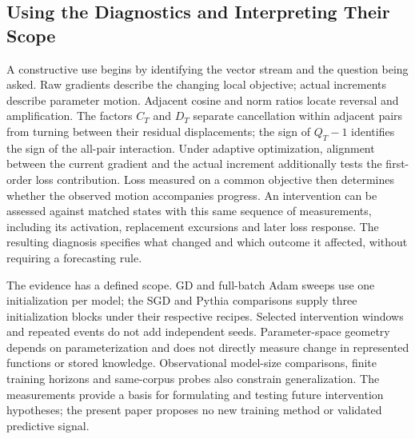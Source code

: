 \subsection{Using the Diagnostics and Interpreting Their Scope}

A constructive use begins by identifying the vector stream and the
question being asked. Raw gradients describe the changing local objective;
actual increments describe parameter motion. Adjacent cosine and norm
ratios locate reversal and amplification. The factors $C_T$ and $D_T$
separate cancellation within adjacent pairs from turning between their
residual displacements; the sign of $Q_T-1$ identifies the sign of the
all-pair interaction. Under adaptive optimization, alignment between
the current gradient and the actual increment additionally tests the
first-order loss contribution. Loss measured on a common objective then determines
whether the observed motion accompanies progress. An intervention can
be assessed against matched states with this same sequence of measurements,
including its activation, replacement excursions and later loss response.
The resulting diagnosis specifies what changed and which outcome it affected,
without requiring a forecasting rule.

The evidence has a defined scope. GD and full-batch Adam sweeps use one
initialization per model; the SGD and Pythia comparisons supply three
initialization blocks under their respective recipes. Selected intervention
windows and repeated events do not add independent seeds. Parameter-space
geometry depends on parameterization and does not directly measure change
in represented functions or stored knowledge. Observational model-size
comparisons, finite training horizons and same-corpus probes also constrain
generalization. The measurements provide a basis for formulating and testing
future intervention hypotheses; the present paper proposes no new training
method or validated predictive signal.
